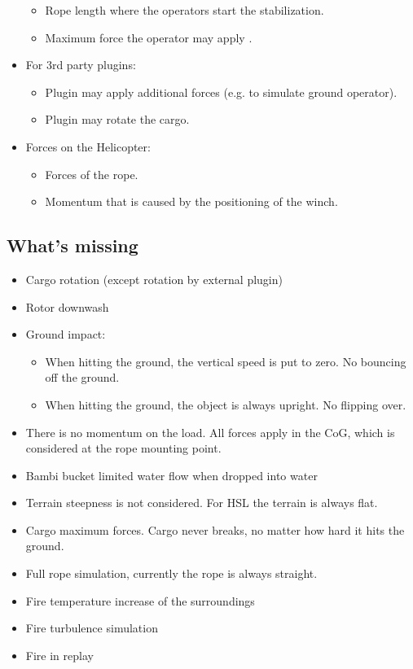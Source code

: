 \documentclass[10pt,a4]{scrartcl}
\begin{document}
\begin{itemize}
\begin{itemize}
\item Rope length where the operators start the stabilization.
\item Maximum force the operator may apply .
\end{itemize}
\item For 3rd party plugins:
\begin{itemize}
\item Plugin may apply additional forces (e.g. to simulate ground operator).
\item Plugin may rotate the cargo.
\end{itemize}
\item Forces on the Helicopter:
\begin{itemize}
\item Forces of the rope.
\item Momentum that is caused by the positioning of the winch.
\end{itemize}
\end{itemize}

\subsection{What's missing}

\begin{itemize}
\item Cargo rotation (except rotation by external plugin)
\item Rotor downwash
\item Ground impact:
\begin{itemize}
\item When hitting the ground, the vertical speed is put to zero. No bouncing off the ground.
\item When hitting the ground, the object is always upright. No flipping over.
\end{itemize}
\item There is no momentum on the load. All forces apply in the CoG, which is considered at the rope mounting point.
\item Bambi bucket limited water flow when dropped into water
\item Terrain steepness is not considered. For HSL the terrain is always flat.
\item Cargo maximum forces. Cargo never breaks, no matter how hard it hits the ground.
\item Full rope simulation, currently the rope is always straight.
\item Fire temperature increase of the surroundings
\item Fire turbulence simulation
\item Fire in replay
\end{itemize}
\end{document}
